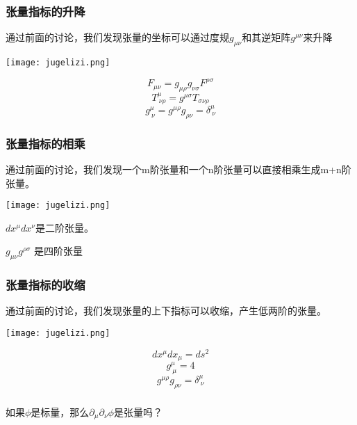 \documentclass[CJK]{beamer}
\begin{document}
\begin{frame}
\frametitle{\bch 张量指标的升降\ech}
\bch
通过前面的讨论，我们发现张量的坐标可以通过度规$g_{\mu\nu}$和其逆矩阵$g^{\mu\nu}$来升降
\ech
{\vskip 0.1in}

\begin{minipage}{0.3\textwidth}
\texttt{[image: jugelizi.png]}
\end{minipage}
\begin{minipage}{0.6\textwidth}
$$F_{\mu\nu} = g_{\mu\rho}g_{\nu\sigma}F^{\rho\sigma}$$
$$T^{\mu}_{\ \nu\rho} = g^{\mu\sigma} T_{\sigma\nu\rho}$$
$$g^{\mu}_{\ \nu} = g^{\mu\rho}g_{\rho\nu} = \delta^{\mu}_{\ \nu}$$
\end{minipage}
\end{frame}


\begin{frame}
\frametitle{\bch 张量指标的相乘\ech}
\bch
通过前面的讨论，我们发现一个m阶张量和一个n阶张量可以直接相乘生成m+n阶张量。
\ech
{\vskip 0.1in}

\begin{minipage}{0.3\textwidth}
\texttt{[image: jugelizi.png]}
\end{minipage}
\begin{minipage}{0.6\textwidth}
\bch
$dx^\mu dx^\nu$是二阶张量。

$g_{\mu\nu}g^{\rho\sigma}$ 是四阶张量
\ech
\end{minipage}
\end{frame}



\begin{frame}
\frametitle{\bch 张量指标的收缩\ech}
\bch
通过前面的讨论，我们发现张量的上下指标可以收缩，产生低两阶的张量。
\ech
{\vskip 0.1in}

\begin{minipage}{0.3\textwidth}
\texttt{[image: jugelizi.png]}
\end{minipage}
\begin{minipage}{0.6\textwidth}
$$dx^\mu dx_\mu = ds^2$$
$$g^{\mu}_{\ \mu} = 4$$
$$g^{\mu\rho}g_{\rho\nu} = \delta^{\mu}_{\ \nu}$$
\end{minipage}
\end{frame}



\begin{frame}
\frametitle{\ech}
\bch
{}
如果$\phi$是标量，那么$\partial_\mu\partial_\nu\phi$是张量吗？
\ech
\end{frame}
\end{document}

